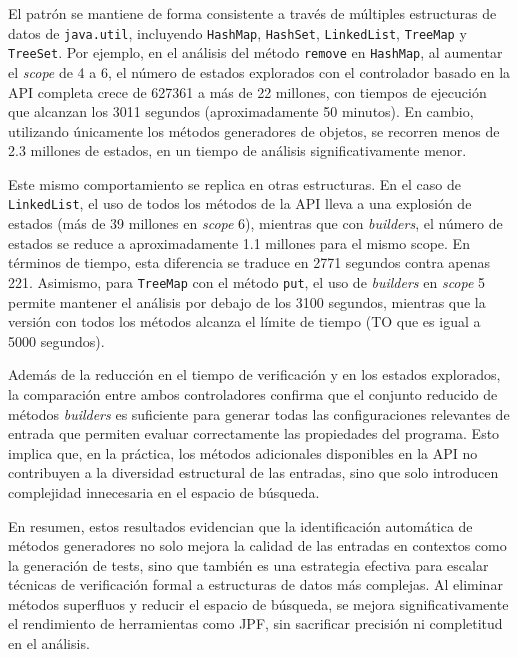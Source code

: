 El patrón se mantiene de forma consistente a través de múltiples estructuras de datos de 
\texttt{java.util}, incluyendo \texttt{HashMap}, \texttt{HashSet}, \texttt{LinkedList}, 
\texttt{TreeMap} y \texttt{TreeSet}. Por ejemplo, en el análisis del método \texttt{remove} 
en \texttt{HashMap}, al aumentar el \textit{scope} de 4 a 6, el número de estados explorados 
con el controlador basado en la API completa crece de 627361 a más de 22 millones, con tiempos 
de ejecución que alcanzan los 3011 segundos (aproximadamente 50 minutos). En cambio, utilizando únicamente los métodos generadores de objetos, 
se recorren menos de 2.3 millones de estados, en un tiempo de análisis significativamente menor.

Este mismo comportamiento se replica en otras estructuras. En el caso de \texttt{LinkedList}, 
el uso de todos los métodos de la API lleva a una explosión de estados (más de 39 millones en 
\textit{scope} 6), mientras que con \emph{builders}, el número de estados se reduce a aproximadamente 
1.1 millones para el mismo scope. En términos de tiempo, esta diferencia se traduce en 2771 segundos contra apenas 221. 
Asimismo, para \texttt{TreeMap} con el método \texttt{put}, el uso de \emph{builders} en 
\textit{scope} 5 permite mantener el análisis por debajo de los 3100 segundos, mientras que 
la versión con todos los métodos alcanza el límite de tiempo (TO que es igual a 5000 segundos).

Además de la reducción en el tiempo de verificación y en los estados explorados, la comparación 
entre ambos controladores confirma que el conjunto reducido de métodos \emph{builders} es suficiente 
para generar todas las configuraciones relevantes de entrada que permiten evaluar correctamente 
las propiedades del programa. Esto implica que, en la práctica, los métodos adicionales disponibles 
en la API no contribuyen a la diversidad estructural de las entradas, sino que solo introducen 
complejidad innecesaria en el espacio de búsqueda.

En resumen, estos resultados evidencian que la identificación automática de métodos generadores no 
solo mejora la calidad de las entradas en contextos como la generación de tests, sino que también 
es una estrategia efectiva para escalar técnicas de verificación formal a estructuras de datos más 
complejas. Al eliminar métodos superfluos y reducir el espacio de búsqueda, se mejora significativamente 
el rendimiento de herramientas como JPF, sin sacrificar precisión ni completitud en el análisis.


